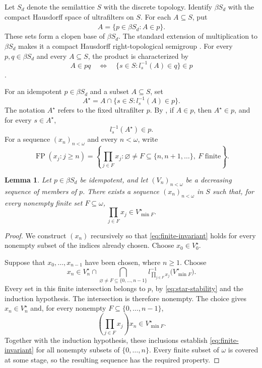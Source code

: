 \documentclass[11pt,a4paper]{article}
\newtheorem{lemma}[theorem]{Lemma}
\theoremstyle{definition}
\theoremstyle{remark}
\numberwithin{equation}{section}
\DeclareMathOperator{\FP}{FP}
\begin{document}
Let \(S_d\) denote the semilattice \(S\) with the discrete topology.
Identify \(\beta S_d\) with the compact Hausdorff space of ultrafilters
on \(S\). For each \(A\subseteq S\), put
\[
\widehat A=\{p\in\beta S_d:A\in p\}.
\]
These sets form a clopen base of \(\beta S_d\).
The standard extension of multiplication to \(\beta S_d\) makes it a
compact Hausdorff right-topological semigroup
\cite[Theorems~4.1 and~4.4]{HS}. For every \(p,q\in\beta S_d\) and
every \(A\subseteq S\), the product is characterized by
\begin{equation}\label{eq:ultrafilter-product}
A\in pq\quad\Longleftrightarrow\quad
\{s\in S:l_s^{-1}(A)\in q\}\in p
\end{equation}
\cite[Theorem~4.12(b)]{HS}.

For an idempotent \(p\in\beta S_d\) and a subset \(A\subseteq S\), set
\[
A^\star=A\cap\{s\in S:l_s^{-1}(A)\in p\}.
\]
The notation \(A^\star\) refers to the fixed ultrafilter \(p\).
By \cite[Definition~4.13 and Lemma~4.14]{HS}, if \(A\in p\), then
\(A^\star\in p\), and for every \(s\in A^\star\),
\begin{equation}\label{eq:star-stability}
l_s^{-1}(A^\star)\in p.
\end{equation}
For a sequence \((x_n)_{n<\omega}\) and every \(n<\omega\), write
\[
\FP(x_j:j\ge n)=
\left\{\prod_{j\in F}x_j:
\varnothing\ne F\subseteq\{n,n+1,\ldots\},\ F\text{ finite}\right\}.
\]

\begin{lemma}\label{lem:diagonal}
Let \(p\in\beta S_d\) be idempotent, and let \((V_n)_{n<\omega}\) be a
decreasing sequence of members of \(p\). There exists a sequence
\((x_n)_{n<\omega}\) in \(S\) such that, for every nonempty finite
set \(F\subseteq\omega\),
\begin{equation}\label{eq:finite-invariant}
\prod_{j\in F}x_j\in V_{\min F}^\star.
\end{equation}
\end{lemma}

\begin{proof}
We construct \((x_n)\) recursively so that \eqref{eq:finite-invariant}
holds for every nonempty subset of the indices already chosen.
Choose \(x_0\in V_0^\star\).

Suppose that \(x_0,\ldots,x_{n-1}\) have been chosen, where \(n\ge1\).
Choose
\[
x_n\in V_n^\star\cap
\bigcap_{\varnothing\ne F\subseteq\{0,\ldots,n-1\}}
l_{\prod_{j\in F}x_j}^{-1}\bigl(V_{\min F}^\star\bigr).
\]
Every set in this finite intersection belongs to \(p\), by
\eqref{eq:star-stability} and the induction hypothesis. The intersection
is therefore nonempty. The choice gives \(x_n\in V_n^\star\) and,
for every nonempty \(F\subseteq\{0,\ldots,n-1\}\),
\[
\left(\prod_{j\in F}x_j\right)x_n\in V_{\min F}^\star.
\]
Together with the induction hypothesis, these inclusions establish
\eqref{eq:finite-invariant} for all nonempty subsets of
\(\{0,\ldots,n\}\). Every finite subset of \(\omega\) is covered
at some stage, so the resulting sequence has the required property.
\end{proof}
\end{document}
